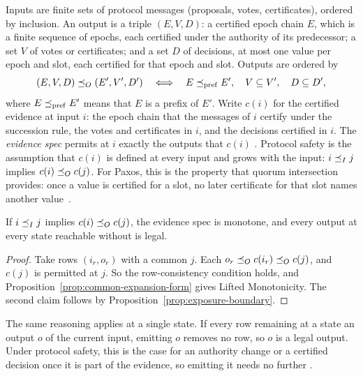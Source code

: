 Inputs are finite sets of protocol messages (proposals, votes,
certificates), ordered by inclusion.  An output is a triple $(E,V,D)$: a
certified epoch chain $E$, which is a finite sequence of epochs, each
certified under the authority of its predecessor; a set $V$ of votes or
certificates; and a set $D$ of decisions, at most one value per epoch and slot,
each certified for that epoch and slot.  Outputs are ordered by
\begin{equation}
  (E,V,D)\preceq_O(E',V',D')
  \quad\Longleftrightarrow\quad
  E\preceq_{\rm pref}E',\quad V\subseteq V',\quad D\subseteq D',
  \label{eq:authority-refinement}
\end{equation}
where $E\preceq_{\rm pref}E'$ means that $E$ is a prefix of $E'$.  Write $c(i)$
for the certified evidence at input $i$: the epoch chain that the messages of
$i$ certify under the succession rule, the votes and certificates in $i$, and
the decisions certified in $i$.  The \emph{evidence spec} permits at $i$
exactly the outputs that $c(i)$ \outrel.  Protocol safety is the assumption
that $c(i)$ is defined at every input and grows with the input:
$i\preceq_I j$ implies $c(i)\preceq_O c(j)$.  For Paxos, this is the
property that quorum intersection provides: once a value is certified for a
slot, no later certificate for that slot names another
value~\cite{lamport2001paxos}.

\begin{proposition}
\label{prop:monotone-evidence}
If $i\preceq_I j$ implies $c(i)\preceq_O c(j)$, the evidence spec is
monotone, and every output at every state reachable without \commitment is
legal.
\end{proposition}

\begin{proof}
Take rows $(i_r,o_r)$ with a common \indesc $j$.  Each
$o_r\preceq_O c(i_r)\preceq_O c(j)$, and $c(j)$ is permitted at $j$.  So the
row-consistency condition holds, and
Proposition~\ref{prop:common-expansion-form} gives Lifted Monotonicity.  The
second claim follows by Proposition~\ref{prop:exposure-boundary}.
\end{proof}

The same reasoning applies at a single state.  If every row remaining at a
state \outrel an output $o$ of the current input, emitting $o$ removes no row,
so $o$ is a legal output.  Under protocol safety, this is the case for an
authority change or a certified decision once it is part of the evidence, so
emitting it needs no further \commitment.

